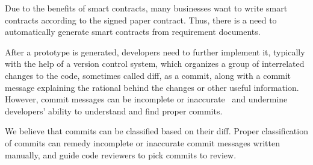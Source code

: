 Due to the benefits of smart contracts, many businesses want to write smart contracts according to the signed paper contract. Thus, there is a need to automatically generate smart contracts from requirement documents.


After a prototype is generated, developers need to further implement it, typically with the help of a version control system,
which organizes a group of interrelated changes to the code, sometimes called diff, as a commit, along with a commit message explaining the rational behind the changes or other useful information.
However, commit messages can be incomplete or inaccurate~\cite{buse2010automatically} and undermine developers' ability to understand and find proper commits.

We believe that commits can be classified based on their diff.
Proper classification of commits can remedy incomplete or inaccurate commit messages written manually, and
guide code reviewers to pick commits to review.



